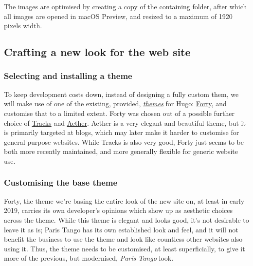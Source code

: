 \documentclass{article}
\begin{document}
The images are optimised by creating a copy of the containing folder, after
which all images are opened in macOS Preview, and resized to a maximum of 1920
pixels width.


\subsection{Crafting a new look for the web site}
\label{sec:org059d975}

\subsubsection{Selecting and installing a theme}
\label{sec:orge73ec23}
To keep development costs down, instead of designing a fully custom them, we
will make use of one of the existing, provided, \emph{\href{https://themes.gohugo.io/aether/}{themes}} for Hugo: \href{https://themes.gohugo.io/forty/}{Forty}, and customise
that to a limited extent. Forty was chosen out of a possible further choice of
\href{https://themes.gohugo.io/hugo-tracks-theme/}{Tracks} and \href{https://themes.gohugo.io/aether/}{Aether}. Aether is a very elegant and beautiful theme, but it is
primarily targeted at blogs, which may later make it harder to customise for
general purpose websites. While Tracks is also very good, Forty just seems to be
both more recently maintained, and more generally flexible for generic website
use.

\subsubsection{Customising the base theme}
\label{sec:orgfbfd030}
Forty, the theme we're basing the entire look of the new site on, at least in
early 2019, carries its own developer's opinions which show up as aesthetic
choices across the theme. While this theme is elegant and looks good, it's not
desirable to leave it as is; Paris Tango has its own established look and feel,
and it will not benefit the business to use the theme and look like countless
other websites also using it. Thus, the theme needs to be customised, at least
superficially, to give it more of the previous, but modernised, \emph{Paris Tango}
look.
\end{document}
